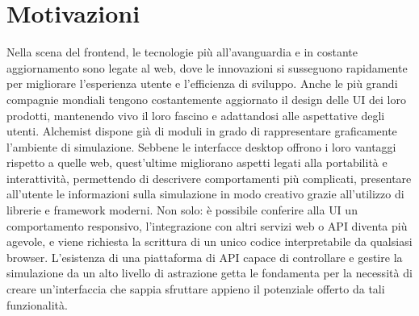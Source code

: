 \section{Motivazioni}
Nella scena del frontend, le tecnologie più all'avanguardia e in costante aggiornamento sono legate al web, dove le innovazioni si susseguono rapidamente per migliorare l'esperienza utente e l'efficienza di sviluppo. Anche le più grandi compagnie mondiali tengono costantemente aggiornato il design delle \ac{UI} dei loro prodotti, mantenendo vivo il loro fascino e adattandosi alle aspettative degli utenti. Alchemist dispone già di moduli in grado di rappresentare graficamente l'ambiente di simulazione. Sebbene le interfacce desktop offrono i loro vantaggi rispetto a quelle web, quest'ultime migliorano aspetti legati alla portabilità e interattività, permettendo di descrivere comportamenti più complicati,  presentare all'utente le informazioni sulla simulazione in modo creativo grazie all'utilizzo di librerie e framework moderni. Non solo: è possibile conferire alla \ac{UI} un comportamento responsivo, l'integrazione con altri servizi web o \ac{API} diventa più agevole, e viene richiesta la scrittura di un unico codice interpretabile da qualsiasi browser. L'esistenza di una piattaforma di \ac{API} capace di controllare e gestire la simulazione da un alto livello di astrazione getta le fondamenta per la necessità di creare un'interfaccia che sappia sfruttare appieno il potenziale offerto da tali funzionalità. 

